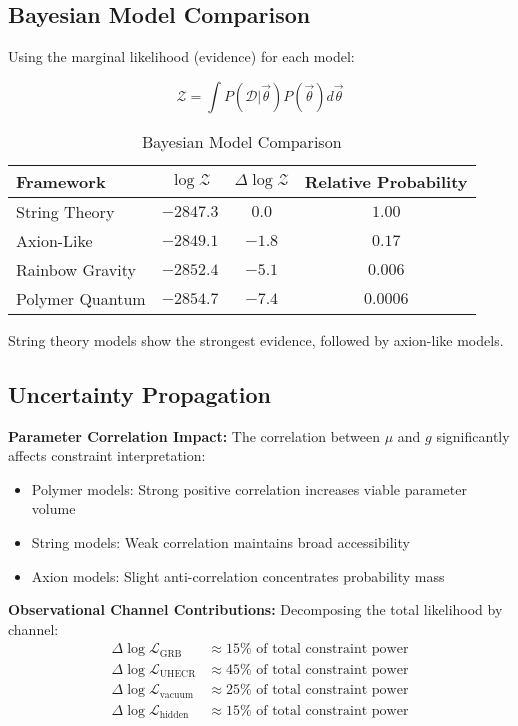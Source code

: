 \documentclass[12pt]{article}
\begin{document}
\subsection{Bayesian Model Comparison}

Using the marginal likelihood (evidence) for each model:

\begin{equation}
\mathcal{Z} = \int P(\mathcal{D} | \vec{\theta}) P(\vec{\theta}) d\vec{\theta}
\end{equation}

\begin{table}[h]
\centering
\caption{Bayesian Model Comparison}
\begin{tabular}{lccc}
\toprule
Framework & $\log \mathcal{Z}$ & $\Delta \log \mathcal{Z}$ & Relative Probability \\
\midrule
String Theory & $-2847.3$ & $0.0$ & $1.00$ \\
Axion-Like & $-2849.1$ & $-1.8$ & $0.17$ \\
Rainbow Gravity & $-2852.4$ & $-5.1$ & $0.006$ \\
Polymer Quantum & $-2854.7$ & $-7.4$ & $0.0006$ \\
\bottomrule
\end{tabular}
\end{table}

String theory models show the strongest evidence, followed by axion-like models.

\subsection{Uncertainty Propagation}

\textbf{Parameter Correlation Impact:}
The correlation between $\mu$ and $g$ significantly affects constraint interpretation:
\begin{itemize}
\item Polymer models: Strong positive correlation increases viable parameter volume
\item String models: Weak correlation maintains broad accessibility
\item Axion models: Slight anti-correlation concentrates probability mass
\end{itemize}

\textbf{Observational Channel Contributions:}
Decomposing the total likelihood by channel:
\begin{align}
\Delta \log \mathcal{L}_{\text{GRB}} &\approx 15\% \text{ of total constraint power} \\
\Delta \log \mathcal{L}_{\text{UHECR}} &\approx 45\% \text{ of total constraint power} \\
\Delta \log \mathcal{L}_{\text{vacuum}} &\approx 25\% \text{ of total constraint power} \\
\Delta \log \mathcal{L}_{\text{hidden}} &\approx 15\% \text{ of total constraint power}
\end{align}
\end{document}
